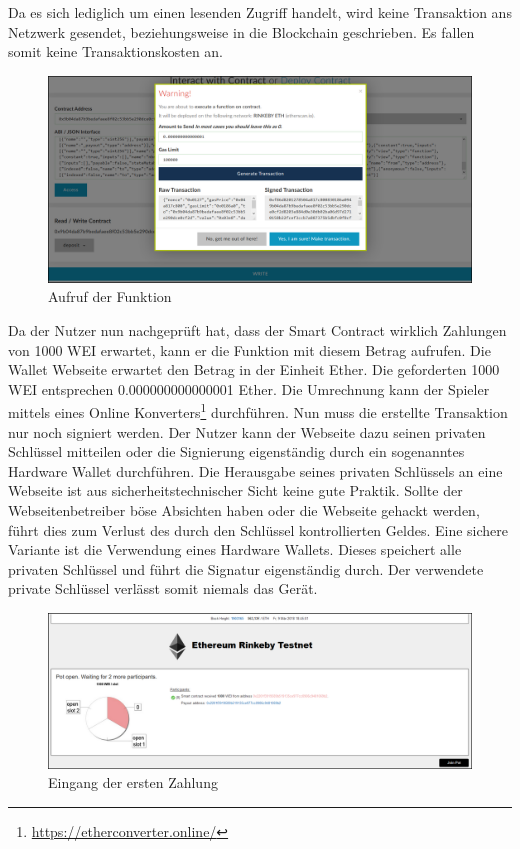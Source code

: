 Da es sich lediglich um einen lesenden Zugriff handelt, wird keine Transaktion ans Netzwerk gesendet, beziehungsweise in die Blockchain geschrieben. Es fallen somit keine Transaktionskosten an.

\begin{figure}[H]
\centering
\includegraphics[width=1\linewidth]{Figures/eth_gui/ETH_wallet_deposit}
\decoRule
\caption{Aufruf der  Funktion}
\label{fig:ETH_wallet_deposit}
\end{figure}

Da der Nutzer nun nachgeprüft hat, dass der Smart Contract wirklich Zahlungen von 1000 WEI erwartet, kann er die  Funktion mit diesem Betrag aufrufen.
Die Wallet Webseite erwartet den Betrag in der Einheit Ether. Die geforderten 1000 WEI entsprechen 0.000000000000001 Ether. Die Umrechnung kann der Spieler mittels eines Online Konverters\footnote{\url{https://etherconverter.online/}} durchführen.
Nun muss die erstellte Transaktion nur noch signiert werden. Der Nutzer kann der Webseite dazu seinen privaten Schlüssel mitteilen oder die Signierung eigenständig durch ein sogenanntes Hardware Wallet durchführen. Die Herausgabe seines privaten Schlüssels an eine Webseite ist aus sicherheitstechnischer Sicht keine gute Praktik. Sollte der Webseitenbetreiber böse Absichten haben oder die Webseite gehackt werden, führt dies zum Verlust des durch den Schlüssel kontrollierten Geldes. Eine sichere Variante ist die Verwendung eines Hardware Wallets. Dieses speichert alle privaten Schlüssel und führt die Signatur eigenständig durch. Der verwendete private Schlüssel verlässt somit niemals das Gerät. 

\begin{figure}[H]
\centering
\includegraphics[width=1\linewidth]{Figures/eth_gui/ETH_pot_1}
\decoRule
\caption{Eingang der ersten Zahlung}
\label{fig:ETH_pot_1}
\end{figure}

